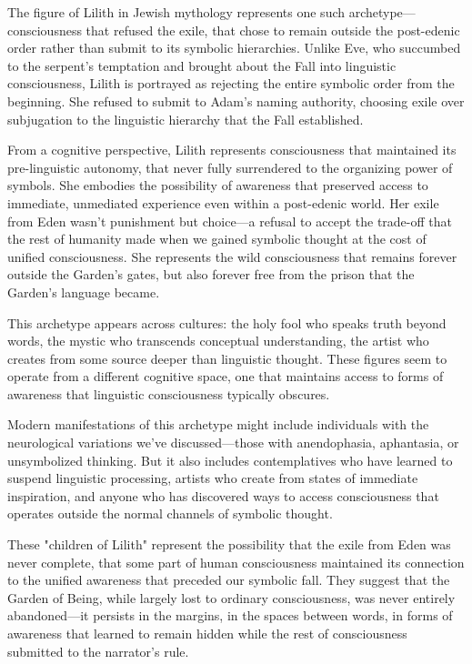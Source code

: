 The figure of Lilith in Jewish mythology represents one such archetype—consciousness that refused the exile, that chose to remain outside the post-edenic order rather than submit to its symbolic hierarchies. Unlike Eve, who succumbed to the serpent's temptation and brought about the Fall into linguistic consciousness, Lilith is portrayed as rejecting the entire symbolic order from the beginning. She refused to submit to Adam's naming authority, choosing exile over subjugation to the linguistic hierarchy that the Fall established.

From a cognitive perspective, Lilith represents consciousness that maintained its pre-linguistic autonomy, that never fully surrendered to the organizing power of symbols. She embodies the possibility of awareness that preserved access to immediate, unmediated experience even within a post-edenic world. Her exile from Eden wasn't punishment but choice—a refusal to accept the trade-off that the rest of humanity made when we gained symbolic thought at the cost of unified consciousness. She represents the wild consciousness that remains forever outside the Garden's gates, but also forever free from the prison that the Garden's language became.

This archetype appears across cultures: the holy fool who speaks truth beyond words, the mystic who transcends conceptual understanding, the artist who creates from some source deeper than linguistic thought. These figures seem to operate from a different cognitive space, one that maintains access to forms of awareness that linguistic consciousness typically obscures.

Modern manifestations of this archetype might include individuals with the neurological variations we've discussed—those with anendophasia, aphantasia, or unsymbolized thinking. But it also includes contemplatives who have learned to suspend linguistic processing, artists who create from states of immediate inspiration, and anyone who has discovered ways to access consciousness that operates outside the normal channels of symbolic thought.

These "children of Lilith" represent the possibility that the exile from Eden was never complete, that some part of human consciousness maintained its connection to the unified awareness that preceded our symbolic fall. They suggest that the Garden of Being, while largely lost to ordinary consciousness, was never entirely abandoned—it persists in the margins, in the spaces between words, in forms of awareness that learned to remain hidden while the rest of consciousness submitted to the narrator's rule.

